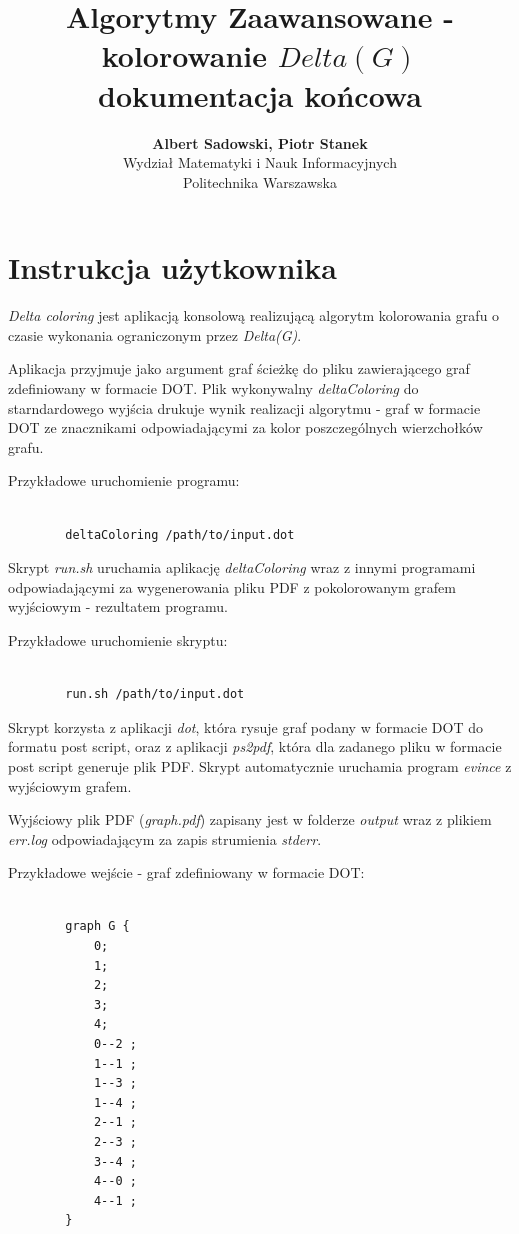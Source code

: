 \documentclass[a4paper]{article}
\title{\textbf{Algorytmy Zaawansowane - kolorowanie $Delta(G)$ dokumentacja końcowa}}
\author{\textbf{Albert Sadowski, Piotr Stanek}\\
	Wydział Matematyki i Nauk Informacyjnych\\
	Politechnika Warszawska}
\begin{document}
	\maketitle

	\section{Instrukcja użytkownika}

	{\em Delta coloring} jest aplikacją konsolową realizującą algorytm kolorowania grafu o czasie wykonania ograniczonym przez {\em Delta(G)}.

	Aplikacja przyjmuje jako argument graf ścieżkę do pliku zawierającego graf zdefiniowany w formacie DOT. Plik wykonywalny {\em deltaColoring} do starndardowego wyjścia drukuje wynik realizacji algorytmu - graf w formacie DOT ze znacznikami odpowiadającymi za kolor poszczególnych wierzchołków grafu.

	Przykładowe uruchomienie programu:

	\begin{verbatim}

		deltaColoring /path/to/input.dot

	\end{verbatim}

	Skrypt {\em run.sh} uruchamia aplikację {\em deltaColoring} wraz z innymi programami odpowiadającymi za wygenerowania pliku PDF z pokolorowanym grafem wyjściowym - rezultatem programu. 

	Przykładowe uruchomienie skryptu:

	\begin{verbatim}

		run.sh /path/to/input.dot

	\end{verbatim}


	Skrypt korzysta z aplikacji {\em dot}, która rysuje graf podany w formacie DOT do formatu post script, oraz z aplikacji {\em ps2pdf}, która dla zadanego pliku w formacie post script generuje plik PDF. Skrypt automatycznie uruchamia program {\em evince} z wyjściowym grafem.

	Wyjściowy plik PDF ({\em graph.pdf}) zapisany jest w folderze {\em output} wraz z plikiem {\em err.log} odpowiadającym za zapis strumienia {\em stderr}.

	Przykładowe wejście - graf zdefiniowany w formacie DOT:

	\begin{verbatim}

		graph G {
			0;
			1;
			2;
			3;
			4;
			0--2 ;
			1--1 ;
			1--3 ;
			1--4 ;
			2--1 ;
			2--3 ;
			3--4 ;
			4--0 ;
			4--1 ;
		}
	

	\end{verbatim}
\end{document}

